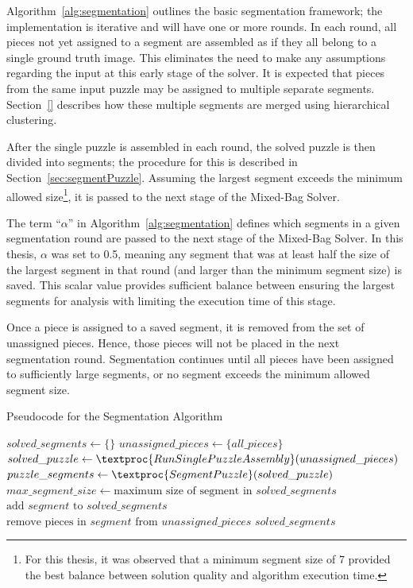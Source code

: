 Algorithm~\ref{alg:segmentation} outlines the basic segmentation framework; the implementation is iterative and will have one or more rounds.  In each round, all pieces not yet assigned to a segment are assembled as if they all belong to a single ground truth image.  This eliminates the need to make any assumptions regarding the input at this early stage of the solver.  It is expected that pieces from the same input puzzle may be assigned to multiple separate segments.  Section~\ref{} describes how these multiple segments are merged using hierarchical clustering.

After the single puzzle is assembled in each round, the solved puzzle is then divided into segments; the procedure for this is described in Section~\ref{sec:segmentPuzzle}.  Assuming the largest segment exceeds the minimum allowed size\footnote{For this thesis, it was observed that a minimum segment size of 7 provided the best balance between solution quality and algorithm execution time.}, it is passed to the next stage of the Mixed-Bag Solver.  

The term ``\textit{$\alpha$}'' in Algorithm~\ref{alg:segmentation} defines which segments in a given segmentation round are passed to the next stage of the Mixed-Bag Solver.  In this thesis, \textit{$\alpha$} was set to 0.5, meaning any segment that was at least half the size of the largest segment in that round (and larger than the minimum segment size) is saved.  This scalar value provides sufficient balance between ensuring the largest segments for analysis with limiting the execution time of this stage.

Once a piece is assigned to a saved segment, it is removed from the set of unassigned pieces.  Hence, those pieces will not be placed in the next segmentation round.  Segmentation continues until all pieces have been assigned to sufficiently large segments, or no segment exceeds the minimum allowed segment size.

\begin{algorithm}[tb]
\caption{Pseudocode for the Segmentation Algorithm}\label{alg:segmentation}
\begin{algorithmic}[1]
    \State $\textit{solved\_segments} \gets \{ \}$
    \State $unassigned\_pieces \gets \{ \textit{all\_pieces} \}$
    \Repeat
        \State $solved\_puzzle \gets \textproc{RunSinglePuzzleAssembly}(unassigned\_pieces)$
        \State $puzzle\_segments \gets \textproc{SegmentPuzzle}(solved\_puzzle\text)$
        \State $max\_segment\_size \gets \text{maximum size of segment in } solved\_segments$
                \State $\text{add } segment \text{ to } solved\_segments$
                \State $\text{remove pieces in } segment \text{ from } unassigned\_pieces$
            \EndIf
        \EndFor
    \State \Return $solved\_segments$
\EndFunction
\end{algorithmic}
\end{algorithm}

